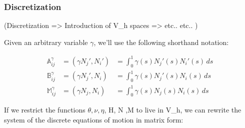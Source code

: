 

\subsubsection{Discretization}\label{matrix-form-of-the-weak-formulation}

(Discretization => Introduction of V_h spaces => etc.. etc.. )

Given an arbitrary variable $\gamma$, we’ll use the following shorthand notation:

\begin{equation}
  \label{eq:2}
  \begin{aligned}
   \mathbb{A}^\gamma_{ij} & = (\gamma N_j', N_i') &  = \int_0^1 \gamma(s) N_j'(s)
    N_i'(s) \, ds \\
     \mathbb{B}^\gamma_{ij} & = (\gamma N_j', N_i) & = \int_0^1 \gamma(s) N_j'(s)
    N_i(s) \, ds \\
     \mathbb{M}^\gamma_{ij} & = (\gamma N_j, N_i) & = \int_0^1 \gamma(s) N_j(s)
    N_i(s) \, ds 
  \end{aligned}
\end{equation}

If we restrict the functions $\theta, \nu, \eta$, H, N ,M to live in V_h, we
can rewrite the system of the discrete equations of motion in matrix form:

